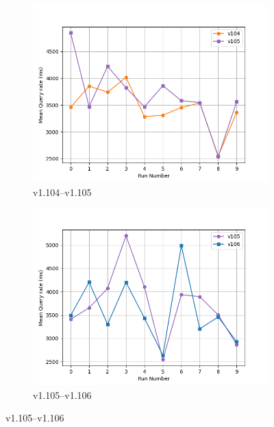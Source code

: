 \begin{figure}[ht]
    \captionsetup[subfigure]{list=true}
    \centering
    \begin{subfigure}[b]{0.48\textwidth}
        \centering
        \includegraphics[width=\textwidth]{figures/mean_query_rate_all_runs-v104-v105.png}
        \caption{v1.104--v1.105}
        \label{fig:mean_query_rate_all_runs-v104-v105}
    \end{subfigure}
    \hfill
    \begin{subfigure}[b]{0.48\textwidth}
        \centering
        \includegraphics[width=\textwidth]{figures/mean_query_rate_all_runs-v105-v106.png}
        \caption{v1.105--v1.106}
        \label{fig:mean_query_rate_all_runs-v105-v106}
    \end{subfigure}


\end{figure}
